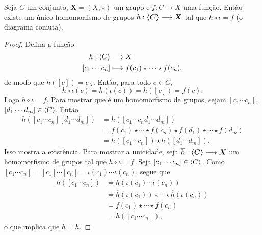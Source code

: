 \begin{prop}
Seja $C$ um conjunto, $\bm X = (X,\star)$ um grupo e $f: C \to X$ uma função. Então existe um único homomorfismo de grupos $h: \bm{\left\langle C \right\rangle} \longrightarrow \bm X$ tal que $h \circ \iota = f$ (o diagrama comuta).
\begin{figure}
\centering
{}
\end{figure}
\end{prop}
\begin{proof}
Defina a função
	\begin{align*}
	{h}: {\left\langle C \right\rangle} &\longrightarrow {X} \\{\left[c_1 \cdots c_n\right] } &\longmapsto {f(c_1) \star \cdots \star f(c_n)},
	\end{align*}
de modo que $h([e])=e_X$. Então, para todo $c \in C$,
	\begin{equation*}
	h \circ \iota(c) = h (\iota(c)) = h([c])=f(c).
	\end{equation*}
Logo $h \circ \iota = f$. Para mostrar que é um homomorfismo de grupos, sejam $[c_1 \cdots c_n],$ $[d_1 \cdots d_m] \in \left\langle C \right\rangle$. Então
	\begin{align*}
	h([c_1 \cdots c_n][d_1 \cdots d_m]) &= h([c_1 \cdots c_nd_1 \cdots d_m]) \\
		&= f(c_1) \star \cdots \star f(c_n) \star f(d_1) \star \cdots  \star f(d_m) \\
		&= h([c_1 \cdots c_n]) \star h([d_1 \cdots d_m]).
	\end{align*}
Isso mostra a existência. Para mostrar a unicidade, seja $\overline h: \bm{\left\langle C \right\rangle} \longrightarrow \bm X$ um homomorfismo de grupos tal que $\overline h \circ \iota = f$. Seja $[c_1 \cdots c_n] \in \left\langle C \right\rangle$. Como $[c_1 \cdots c_n] = [c_1] \cdots [c_n] = \iota(c_1) \cdots \iota(c_n)$, segue que
	\begin{align*}
	\overline h ([c_1 \cdots c_n]) &= \overline h(\iota(c_1) \cdots \iota(c_n)) \\
		&= \overline h(\iota(c_1)) \star \cdots \star \overline h(\iota(c_n)) \\
		&= f(c_1) \star \cdots \star f(c_n) \\
		&= h([c_1 \cdots c_n]),
	\end{align*}
o que implica que $\overline h = h$.
\end{proof}


